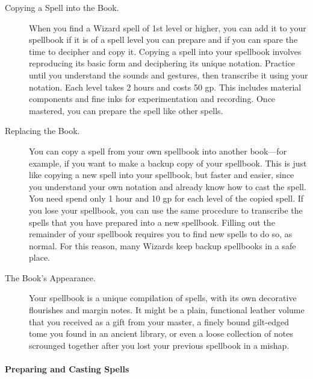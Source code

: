 \begin{description}
\item[Copying a Spell into the Book.]
When you find a Wizard spell of 1st level or higher, you can add it to
your spellbook if it is of a spell level you can prepare and if you can
spare the time to decipher and copy it. Copying a spell into your
spellbook involves reproducing its basic form and deciphering its unique
notation. Practice until you understand the sounds and gestures, then
transcribe it using your notation. Each level takes 2 hours and costs 50
gp. This includes material components and fine inks for experimentation
and recording. Once mastered, you can prepare the spell like other
spells.
\item[Replacing the Book.]
You can copy a spell from your own spellbook into another book---for
example, if you want to make a backup copy of your spellbook. This is
just like copying a new spell into your spellbook, but faster and
easier, since you understand your own notation and already know how to
cast the spell. You need spend only 1 hour and 10 gp for each level of
the copied spell. If you lose your spellbook, you can use the same
procedure to transcribe the spells that you have prepared into a new
spellbook. Filling out the remainder of your spellbook requires you to
find new spells to do so, as normal. For this reason, many Wizards keep
backup spellbooks in a safe place.
\item[The Book's Appearance.]
Your spellbook is a unique compilation of spells, with its own
decorative flourishes and margin notes. It might be a plain, functional
leather volume that you received as a gift from your master, a finely
bound gilt-edged tome you found in an ancient library, or even a loose
collection of notes scrounged together after you lost your previous
spellbook in a mishap.
\end{description}

\paragraph{Preparing and Casting
Spells}\label{_preparing_and_casting_spells_2}

